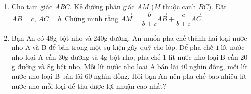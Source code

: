 \begin{bt}%
	\begin{enumerate}
		\item Cho tam giác $ABC$. Kẻ đường phân giác $AM$ ($M$ thuộc cạnh $BC$). Đặt $AB=c$, $AC=b$. Chứng minh rằng $\vec{AM}=\dfrac{b}{b+c}\vec{AB}+\dfrac{c}{b+c}\vec{AC}$.
		\item Bạn An có $48$g bột nho và $240$g đường. An muốn pha chế thành hai loại nước nho A và B để bán trong một sự kiện gây quỹ cho lớp. Để pha chế $1$ lít nước nho loại A cần $30$g đường và $4$g bột nho; pha chế $1$ lít nước nho loại B cần $20$g đường và $8$g bột nho. Mỗi lít nước nho loại A bán lãi $40$ nghìn đồng, mỗi lít nước nho loại B bán lãi $60$ nghìn đồng. Hỏi bạn An nên pha chế bao nhiêu lít nước nho mỗi loại để thu được lợi nhuận cao nhất?
	\end{enumerate}
\end{bt}
